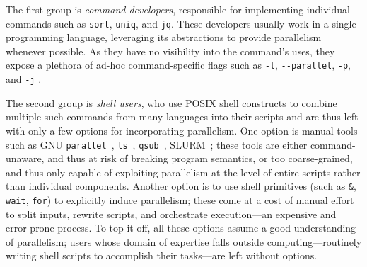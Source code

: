 \documentclass[letterpaper,twocolumn,10pt]{article}
\newcommand{\ttt}[1]{\texttt{#1}}
\newcommand{\nv}[1]{[{\color{cyan}nv: #1}]}
\newcommand{\kk}[1]{[{\color{magenta}kk: #1}]}
\begin{document}
The first group is \emph{command developers}, responsible for implementing individual commands such as \ttt{sort}, \ttt{uniq}, and \ttt{jq}.
These developers usually work in a single programming language, leveraging its abstractions to provide parallelism whenever possible.
As they have no visibility into the command's uses, they expose a plethora of ad-hoc command-specific flags such as \ttt{-t}, \ttt{-}\ttt{-parallel}, \ttt{-p}, and \ttt{-j} %
\cite{pasetto2011comparative, mcilroy1993engineering, stallman1991gnu}.

The second group is \emph{shell users}, who use POSIX shell constructs to combine multiple such commands from many languages into their scripts and are thus left with only a few options for incorporating parallelism.
One option is manual tools such as GNU \ttt{parallel}~\cite{Tange2011a}, \ttt{ts}~\cite{tsp}, \ttt{qsub}~\cite{gentzsch2001sun}, \textsc{SLURM}~\cite{yoo2003slurm};
  these tools are either command-unaware, and thus at risk of breaking program semantics, or too coarse-grained, and thus only capable of exploiting parallelism at the level of entire scripts rather than individual components.
Another option is to use shell primitives (such as \ttt{\&}, \ttt{wait}, \ttt{for}) to explicitly induce parallelism;
 these come at a cost of manual effort to split inputs, rewrite scripts, and orchestrate execution---an expensive and error-prone process.
To top it off, all these options assume a good understanding of parallelism;
  users whose domain of expertise falls outside computing---routinely writing shell scripts to accomplish their tasks---are left without options.
\end{document}
